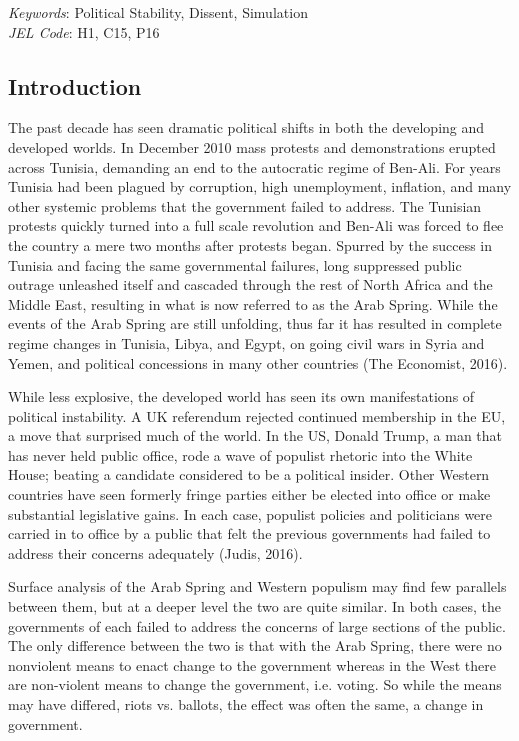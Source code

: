 \documentclass[12pt]{article}
\begin{document}
\begin{titlepage}
\begin{abstract}
\end{abstract}

\noindent \textit{Keywords}: Political Stability, Dissent, Simulation \\

\noindent \textit{JEL Code}: H1, C15, P16


\end{titlepage}

\begin{spacing}{1.5}


\section{Introduction}

The past decade has seen dramatic political shifts in both the developing and developed worlds. In December 2010 mass protests and demonstrations erupted across Tunisia, demanding an end to the autocratic regime of Ben-Ali. For years Tunisia had been plagued by corruption, high unemployment, inflation, and many other systemic problems that the government failed to address. The Tunisian protests quickly turned into a full scale revolution and Ben-Ali was forced to flee the country a mere two months after protests began. Spurred by the success in Tunisia and facing the same governmental failures, long suppressed public outrage unleashed itself and cascaded through the rest of North Africa and the Middle East, resulting in what is now referred to as the Arab Spring. While the events of the Arab Spring are still unfolding, thus far it has resulted in complete regime changes in Tunisia, Libya, and Egypt, on going civil wars in Syria and Yemen, and political concessions in many other countries (The Economist, 2016).  

While less explosive, the developed world has seen its own manifestations of political instability. A UK referendum rejected continued membership in the EU, a move that surprised much of the world. In the US, Donald Trump, a man that has never held public office, rode a wave of populist rhetoric into the White House; beating a candidate considered to be a political insider. Other Western countries have seen formerly fringe parties either be elected into office or make substantial legislative gains. In each case, populist policies and politicians were carried in to office by a public that felt the previous governments had failed to address their concerns adequately (Judis, 2016).

Surface analysis of the Arab Spring and Western populism may find few parallels between them, but at a deeper level the two are quite similar. In both cases, the governments of each failed to address the concerns of large sections of the public. The only difference between the two is that with the Arab Spring, there were no nonviolent means to enact change to the government whereas in the West there are non-violent means to change the government, i.e. voting. So while the means may have differed, riots vs. ballots, the effect was often the same, a change in government.  


\end{spacing}
\end{document}
